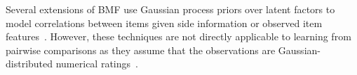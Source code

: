 Several extensions of BMF use Gaussian process priors over latent factors 
to model correlations between 
items given side information or observed item features~\citep{adams2010incorporating,zhou2012kernelized,houlsby2012collaborative,bolgar2016bayesian}. 
However, these techniques are not directly applicable to 
learning from pairwise comparisons 
as they assume that the observations are Gaussian-distributed numerical ratings~\citep{shi2017survey}. 

